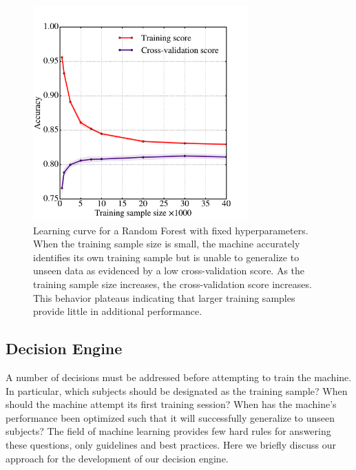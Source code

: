 \documentclass[twocolumn, trackchanges, linenumbers]{aastex6}%
\begin{document}
\begin{figure}[t!]
\includegraphics[width=3.25in]{f6.pdf}
\caption{Learning curve for a Random Forest with fixed hyperparameters.  When the training sample size is small, the machine accurately identifies its own training sample but is unable to generalize to unseen data as evidenced by a low cross-validation score. As the training sample size increases, the cross-validation score increases. This behavior plateaus indicating that larger training samples provide little in additional performance. \label{fig: learning curve}}
\end{figure}


\subsection{Decision Engine}\label{sec: decision engine}
A number of decisions must be addressed before attempting to train the machine. 
In particular, which subjects should be designated as the training sample? 
When should the machine attempt its first training session? 
When has the machine's performance been optimized such that it will successfully
generalize to unseen subjects? The field of machine learning provides few hard rules 
for answering these questions, only guidelines and best practices. 
Here we briefly discuss our approach for the development of our decision engine.
\end{document}
